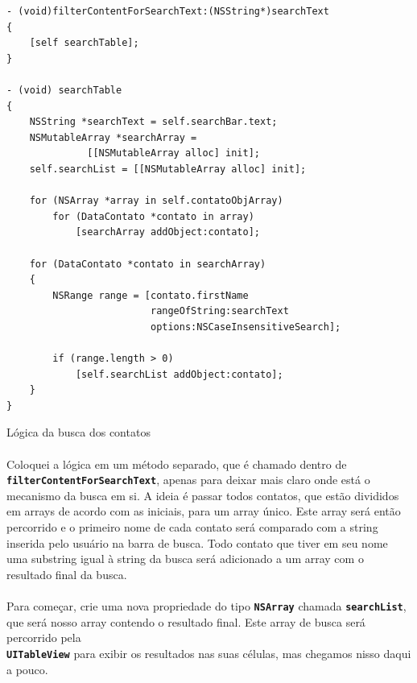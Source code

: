 \documentclass[a4paper,12pt,brazil,doubleside]{book}
\begin{document}
\begin{singlespace}
\begin{listing}[H]
\begin{verbatim}
- (void)filterContentForSearchText:(NSString*)searchText
{
    [self searchTable];
}

- (void) searchTable
{
    NSString *searchText = self.searchBar.text;
    NSMutableArray *searchArray =
              [[NSMutableArray alloc] init];
    self.searchList = [[NSMutableArray alloc] init];
    
    for (NSArray *array in self.contatoObjArray)
        for (DataContato *contato in array)
            [searchArray addObject:contato];
    
    for (DataContato *contato in searchArray)
    {
        NSRange range = [contato.firstName
                         rangeOfString:searchText
                         options:NSCaseInsensitiveSearch];
        
        if (range.length > 0)
            [self.searchList addObject:contato];
    }
}
\end{verbatim}
\caption{Lógica da busca dos contatos}
\end{listing}

\paragraph{}Coloquei a lógica em um método separado, que é chamado dentro de\\
\texttt{\textbf{filterContentForSearchText}}, apenas para deixar mais claro onde está o mecanismo da busca em si. A ideia é passar todos contatos, que estão divididos em arrays de acordo com as iniciais, para um array único. Este array será então percorrido e o primeiro nome de cada contato será comparado com a string inserida pelo usuário na barra de busca. Todo contato que tiver em seu nome uma substring igual à string da busca será adicionado a um array com o resultado final da busca.
\paragraph{}Para começar, crie uma nova propriedade do tipo \texttt{\textbf{NSArray}} chamada \texttt{\textbf{searchList}}, que será nosso array contendo o resultado final. Este array de busca será percorrido pela\\
\texttt{\textbf{UITableView}} para exibir os resultados nas suas células, mas chegamos nisso daqui a pouco.

\end{singlespace}
\end{document}
